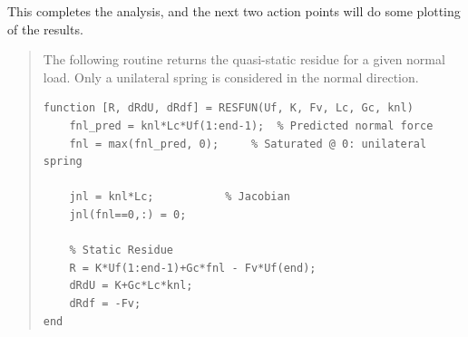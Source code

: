 \documentclass[11pt]{article}
\begin{document}
This completes the analysis, and the next two action points will do some plotting of the results.

\begin{quote}
                              \begin{tcolorbox}[colback=osbe-bg,colframe=osbe-fg,title={Static Residue Routine RESFUN.m},sharp corners,boxrule=0.4pt]
The following routine returns the quasi-static residue for a given normal load.
Only a unilateral spring is considered in the normal direction.
\begin{verbatim}
function [R, dRdU, dRdf] = RESFUN(Uf, K, Fv, Lc, Gc, knl)
    fnl_pred = knl*Lc*Uf(1:end-1);	% Predicted normal force
    fnl = max(fnl_pred, 0);		% Saturated @ 0: unilateral spring

    jnl = knl*Lc;			% Jacobian
    jnl(fnl==0,:) = 0;			

    % Static Residue
    R = K*Uf(1:end-1)+Gc*fnl - Fv*Uf(end);
    dRdU = K+Gc*Lc*knl;
    dRdf = -Fv;
end
\end{verbatim}


               \end{tcolorbox}
\end{quote}
\end{document}
